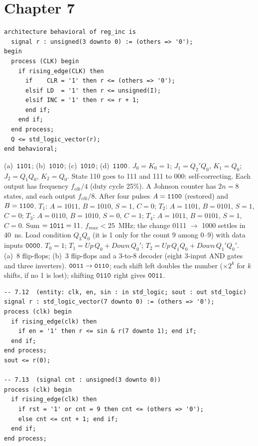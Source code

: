\section*{Chapter 7}
 \begin{lstlisting}
architecture behavioral of reg_inc is
  signal r : unsigned(3 downto 0) := (others => '0');
begin
  process (CLK) begin
    if rising_edge(CLK) then
      if    CLR = '1' then r <= (others => '0');
      elsif LD  = '1' then r <= unsigned(I);
      elsif INC = '1' then r <= r + 1;
      end if;
    end if;
  end process;
  Q <= std_logic_vector(r);
end behavioral;\end{lstlisting}
 (a)~$\mathtt{1101}$; (b)~$\mathtt{1010}$; (c)~$\mathtt{1010}$; (d)~$\mathtt{1100}$.
 $J_0=K_0=1$; $J_1=Q_2'Q_0$, $K_1=Q_0$; $J_2=Q_1Q_0$, $K_2=Q_0$. State 110 goes to 111 and 111 to 000: self-correcting.
 Each output has frequency $f_{clk}/4$ (duty cycle 25\%). A Johnson counter has $2n=8$ states, and each output $f_{clk}/8$.
 After four pulses $A=\mathtt{1100}$ (restored) and $B=\mathtt{1100}$.
 $T_1$: $A=1011$, $B=1010$, $S=1$, $C=0$; $T_2$: $A=1101$, $B=0101$, $S=1$, $C=0$; $T_3$: $A=0110$, $B=1010$, $S=0$, $C=1$; $T_4$: $A=1011$, $B=0101$, $S=1$, $C=0$. Sum $=\mathtt{1011}=11$.
 $f_{max}<25$~MHz; the change 0111 $\to$ 1000 settles in 40~ns.
 Load condition $Q_3Q_0$ (it is 1 only for the count 9 among 0--9) with data inputs $\mathtt{0000}$.
 $T_0=1$; $T_1=\mathit{Up}\,Q_0+\mathit{Down}\,Q_0'$; $T_2=\mathit{Up}\,Q_1Q_0+\mathit{Down}\,Q_1'Q_0'$.
 (a)~8 flip-flops; (b)~3 flip-flops and a 3-to-8 decoder (eight 3-input AND gates and three inverters).
 $\mathtt{0011}\to\mathtt{0110}$; each shift left doubles the number ($\times2^k$ for $k$ shifts, if no 1 is lost); shifting $\mathtt{0110}$ right gives $\mathtt{0011}$.
 \begin{lstlisting}
-- 7.12  (entity: clk, en, sin : in std_logic; sout : out std_logic)
signal r : std_logic_vector(7 downto 0) := (others => '0');
process (clk) begin
  if rising_edge(clk) then
    if en = '1' then r <= sin & r(7 downto 1); end if;
  end if;
end process;
sout <= r(0);

-- 7.13  (signal cnt : unsigned(3 downto 0))
process (clk) begin
  if rising_edge(clk) then
    if rst = '1' or cnt = 9 then cnt <= (others => '0');
    else cnt <= cnt + 1; end if;
  end if;
end process;\end{lstlisting}

